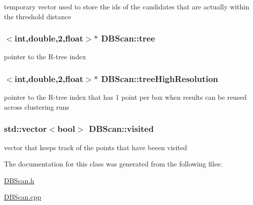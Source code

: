 temporary vector used to store the ids of the candidates that are actually within the threshold distance \hypertarget{classDBScan_a406fc451a7b6b25b11cb08545a03e281}{
\subsubsection[{tree}]{$<$int,double,2,float$>$$\ast$ D\-B\-Scan\-::tree\hspace{0.3cm}{\ttfamily [private]}}}\label{classDBScan_a406fc451a7b6b25b11cb08545a03e281}
pointer to the R-\/tree index \hypertarget{classDBScan_a8fd30e735fa3b426e519a8ecb7586c4d}{
\subsubsection[{tree\-High\-Resolution}]{$<$int,double,2,float$>$$\ast$ D\-B\-Scan\-::tree\-High\-Resolution\hspace{0.3cm}{\ttfamily [private]}}}\label{classDBScan_a8fd30e735fa3b426e519a8ecb7586c4d}
pointer to the R-\/tree index that has 1 point per box when results can be reused across clustering runs \hypertarget{classDBScan_a03bbe4567af4354c0cba4e580cf72578}{
\subsubsection[{visited}]{\setlength{\rightskip}{0pt plus 5cm}std\-::vector$<$bool$>$ D\-B\-Scan\-::visited\hspace{0.3cm}{\ttfamily [private]}}}\label{classDBScan_a03bbe4567af4354c0cba4e580cf72578}
vector that keeps track of the points that have beeen visited 

The documentation for this class was generated from the following files\-:\begin{DoxyCompactItemize}
\item 
\hyperlink{DBScan_8h}{D\-B\-Scan.\-h}\item 
\hyperlink{DBScan_8cpp}{D\-B\-Scan.\-cpp}\end{DoxyCompactItemize}
